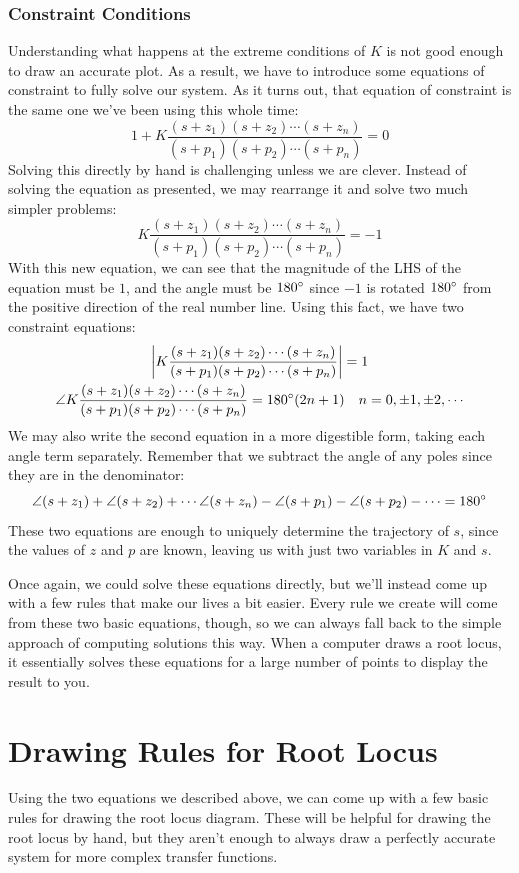 \subsubsection{Constraint Conditions}
Understanding what happens at the extreme conditions of $K$ is not good enough to draw an accurate plot. As a result, we have to introduce some equations of constraint to fully solve our system. As it turns out, that equation of constraint is the same one we've been using this whole time:
$$1+K\frac{(s+z_1)(s+z_2)\cdots(s+z_n)}{(s+p_1)(s+p_2)\cdots(s+p_n)}=0$$
Solving this directly by hand is challenging unless we are clever. Instead of solving the equation as presented, we may rearrange it and solve two much simpler problems:
$$K\frac{(s+z_1)(s+z_2)\cdots(s+z_n)}{(s+p_1)(s+p_2)\cdots(s+p_n)}=-1$$
With this new equation, we can see that the magnitude of the LHS of the equation must be $1$, and the angle must be $180\degree$ since $-1$ is rotated $180\degree$ from the positive direction of the real number line. Using this fact, we have two constraint equations:
\begin{gather}
    \left|K\frac{(s+z_1)(s+z_2)\cdots(s+z_n)}{(s+p_1)(s+p_2)\cdots(s+p_n)}\right|=1\\
    \angle{K\frac{(s+z_1)(s+z_2)\cdots(s+z_n)}{(s+p_1)(s+p_2)\cdots(s+p_n)}}=180\degree(2n+1)\quad n=0,\pm1,\pm2,\cdots
\end{gather}
We may also write the second equation in a more digestible form, taking each angle term separately. Remember that we subtract the angle of any poles since they are in the denominator:
$$\angle{(s+z_1)}+\angle{(s+z_2)}+\cdots\angle{(s+z_n)-\angle(s+p_1)-\angle(s+p_2)-\cdots=180\degree}$$
These two equations are enough to uniquely determine the trajectory of $s$, since the values of $z$ and $p$ are known, leaving us with just two variables in $K$ and $s$.

Once again, we could solve these equations directly, but we'll instead come up with a few rules that make our lives a bit easier. Every rule we create will come from these two basic equations, though, so we can always fall back to the simple approach of computing solutions this way. When a computer draws a root locus, it essentially solves these equations for a large number of points to display the result to you.

\section{Drawing Rules for Root Locus}
Using the two equations we described above, we can come up with a few basic rules for drawing the root locus diagram. These will be helpful for drawing the root locus by hand, but they aren't enough to always draw a perfectly accurate system for more complex transfer functions.
